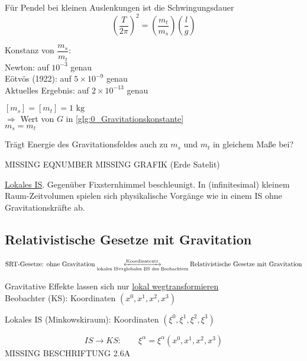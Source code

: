 \documentclass[a4paper, 11pt]{article}
\numberwithin{equation}{section}
\begin{document}
Für Pendel bei kleinen Auslenkungen ist die Schwingungsdauer
\begin{equation}
\left(\dfrac{T}{2 \pi} \right)^2 = \left(\dfrac{m_t}{m_s} \right) \left( \dfrac{l}{g} \right)
\end{equation}

Konstanz von $\dfrac{m_s}{m_t}$:\\
Newton: auf $10^{-3}$ genau\\
Eötvös (1922): auf $ 5 \times 10^{-9}$ genau\\
Aktuelles Ergebnis: auf $2 \times 10^{-13}$ genau


$[m_s] = [m_t] = 1 \text{ kg}$\\
$\Rightarrow$ Wert von $G$ in \ref{glg:0_Gravitationskonstante}\\
$m_s = m_t$

Trägt Energie des Gravitationsfeldes auch zu $m_s$ und $m_t$ in gleichem Maße bei?


MISSING EQNUMBER
\setcounter{equation}{5}
MISSING GRAFIK (Erde Satelit)


\underline{Lokales IS}. Gegenüber Fixsternhimmel beschleunigt.
In (infinitesimal) kleinem Raum-Zeitvolumen spielen sich physikalische Vorgänge wie in einem IS ohne Gravitationskräfte ab.

\subsection*{Relativistische Gesetze mit Gravitation}


\begin{equation*}
\text{SRT-Gesetze: ohne Gravitation} \underset{\text{lokales IS} \leftrightarrow \text{globales BS des Beobachters}}{\xleftrightarrow{\text{Koordinatentr.}}} \text{Relativistische Gesetze mit Gravitation}
\end{equation*}

Gravitative Effekte lassen sich nur \underline{lokal wegtransformieren}\\
Beobachter (KS): Koordinaten $(x^0, x^1, x^2, x^3)$


Lokales IS (Minkowskiraum): Koordinaten $(\xi^0,  \xi^1, \xi^2, \xi^3)$

\begin{equation}
IS \rightarrow KS: \qquad \xi^\alpha = \xi^\alpha (x^0, x^1, x^2, x^3)
\end{equation}
MISSING BESCHRIFTUNG 2.6A
\end{document}
